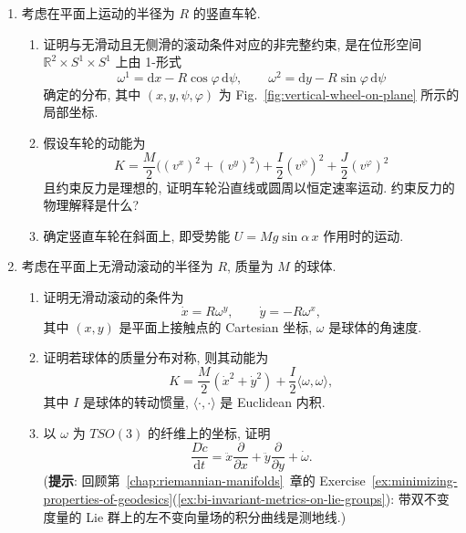 \begin{RiemannExercise}
\begin{enumerate}[label=(\arabic*),ref=\arabic*,leftmargin=*]
\begin{enumerate}[label=(\alph*),leftmargin=*]
\item 证明冰刀可以到达位形空间中的所有点: 给定两点 $p,q\in\mathbb{R}^2\times S^1$, 存在与 $\Sigma$ 相容的分段光滑曲线 $c:[0,1]\to\mathbb{R}^2\times S^1$, 使 $c(0)=p$ 且 $c(1)=q$. 为什么由此可知 $\Sigma$ 不可积?
\item 假设冰刀的动能为
\[
  K=\frac{M}{2}\bigl((v^x)^2+(v^y)^2\bigr)+\frac{I}{2}(v^\theta)^2
\]
且约束反力是理想的, 证明冰刀沿直线或圆周以恒定速率运动. 约束反力的物理解释是什么?
\item 确定冰刀在斜面上, 即受势能 $U=Mg\sin\alpha\,x$ 作用时的运动.
\end{enumerate}
\item\label{ex:vertical-wheel-dynamics}
考虑在平面上运动的半径为 $R$ 的竖直车轮.
\begin{enumerate}[label=(\alph*),leftmargin=*]
\item 证明与无滑动且无侧滑的滚动条件对应的非完整约束, 是在位形空间 $\mathbb{R}^2\times S^1\times S^1$ 上由 1-形式
\[
  \omega^1=\mathrm{d}x-R\cos\varphi\,\mathrm{d}\psi,\qquad
  \omega^2=\mathrm{d}y-R\sin\varphi\,\mathrm{d}\psi
\]
确定的分布, 其中 $(x,y,\psi,\varphi)$ 为 Fig.~\ref{fig:vertical-wheel-on-plane} 所示的局部坐标.
\item 假设车轮的动能为
\[
  K=\frac{M}{2}\bigl((v^x)^2+(v^y)^2\bigr)
  +\frac{I}{2}(v^\psi)^2+\frac{J}{2}(v^\varphi)^2
\]
且约束反力是理想的, 证明车轮沿直线或圆周以恒定速率运动. 约束反力的物理解释是什么?
\item 确定竖直车轮在斜面上, 即受势能 $U=Mg\sin\alpha\,x$ 作用时的运动.
\end{enumerate}
\item\label{ex:rolling-sphere-dynamics}
考虑在平面上无滑动滚动的半径为 $R$, 质量为 $M$ 的球体.
\begin{enumerate}[label=(\alph*),leftmargin=*]
\item 证明无滑动滚动的条件为
\[
  \dot x=R\omega^y,\qquad \dot y=-R\omega^x,
\]
其中 $(x,y)$ 是平面上接触点的 Cartesian 坐标, $\omega$ 是球体的角速度.
\item 证明若球体的质量分布对称, 则其动能为
\[
  K=\frac{M}{2}(\dot x^2+\dot y^2)+\frac{I}{2}\langle\omega,\omega\rangle,
\]
其中 $I$ 是球体的转动惯量, $\langle\cdot,\cdot\rangle$ 是 Euclidean 内积.
\item 以 $\omega$ 为 $TSO(3)$ 的纤维上的坐标, 证明
\[
  \frac{D\dot c}{\mathrm{d}t}=\ddot x\frac{\partial}{\partial x}
  +\ddot y\frac{\partial}{\partial y}+\dot\omega.
\]
(\textbf{提示}: 回顾第~\ref{chap:riemannian-manifolds}~章的 Exercise~\ref{ex:minimizing-properties-of-geodesics}(\ref{ex:bi-invariant-metrics-on-lie-groups}): 带双不变度量的 Lie 群上的左不变向量场的积分曲线是测地线.)

\end{enumerate}
\end{enumerate}
\end{RiemannExercise}
